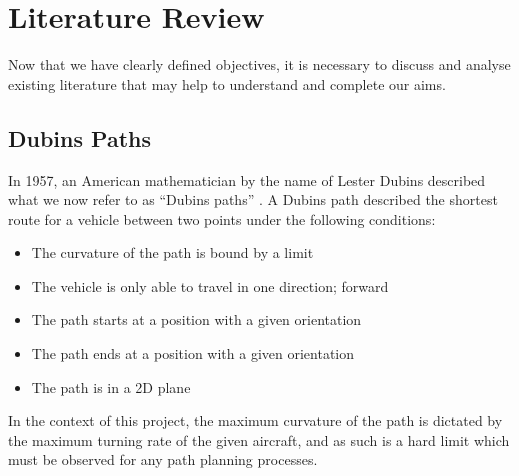 
\chapter{Literature Review}
\label{litrev}

\graphicspath{{Chapter2/Figs/}}

Now that we have clearly defined objectives, it is necessary to discuss and analyse existing literature that may help to understand and complete our aims.  


\section{Dubins Paths}
\label{litrev:dubins}
In 1957, an American mathematician by the name of Lester Dubins described what we now refer to as ``Dubins paths'' \cite{dubins1957curves}. A Dubins path described the shortest route for a vehicle between two points under the following conditions:
\begin{itemize}
	\item The curvature of the path is bound by a limit
	\item The vehicle is only able to travel in one direction; forward
	\item The path starts at a position with a given orientation
	\item The path ends at a position with a given orientation
	\item The path is in a 2D plane
\end{itemize}

In the context of this project, the maximum curvature of the path is dictated by the maximum turning rate of the given aircraft, and as such is a hard limit which must be observed for any path planning processes.

